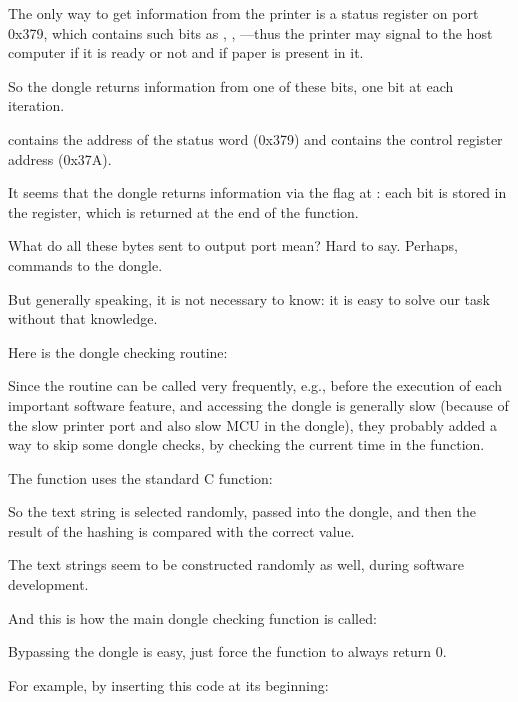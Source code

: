 The only way to get information from the printer is a status register on port 0x379, which contains
such bits as , , ---thus the printer may signal to the host computer
if it is ready or not and if paper is present in it.

So the dongle returns information from one of these bits, one bit at each iteration.

 contains the address of the status word (0x379) and 
 contains the control register address (0x37A).

It seems that the dongle returns information via the  flag at : 
each bit is stored in the  register, which is returned at the end of the function.

What do all these bytes sent to output port mean?
Hard to say. Perhaps, commands to the dongle.

But generally speaking, it is not necessary to know: it is easy to solve our task without that knowledge.

Here is the dongle checking routine:



Since the routine can be called very frequently, e.g., before the execution of each important software feature, 
and accessing the dongle is generally slow (because of the slow printer port and also slow
\ac{MCU} in the dongle), they probably added a way to skip some dongle checks,
by checking the current time in the  function.

The  
function uses the standard C function:



So the text string is selected randomly, passed into the dongle, and then the result of the hashing 
is compared with the correct value.

The text strings seem to be constructed randomly as well, during software development.

And this is how the main dongle checking function is called:



Bypassing the dongle is easy, just force the  function to always return 0.

For example, by inserting this code at its beginning:

